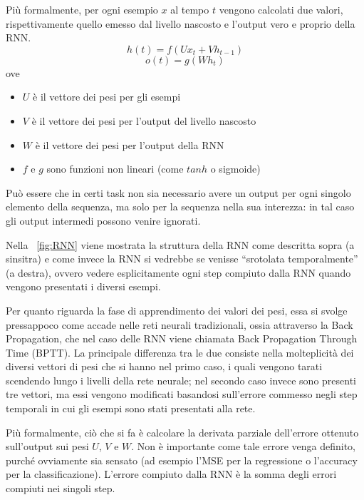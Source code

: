 Più formalmente, per ogni esempio $x$ al tempo $t$ vengono calcolati due valori, rispettivamente quello emesso dal livello nascosto e l'output vero e proprio della RNN.
\begin{equation*}
    h(t) = f(U x_t + V h_{t-1})
\end{equation*}
\begin{equation*}
    o(t) = g(W h_t)
\end{equation*}
ove
\begin{itemize}
    \item $U$ è il vettore dei pesi per gli esempi
    \item $V$ è il vettore dei pesi per l'output del livello nascosto
    \item $W$ è il vettore dei pesi per l'output della RNN
    \item $f$ e $g$ sono funzioni non lineari (come $tanh$ o sigmoide)
\end{itemize}
Può essere che in certi task non sia necessario avere un output per ogni singolo elemento della sequenza, ma solo per la sequenza nella sua interezza: in tal caso gli output intermedi possono venire ignorati.

Nella \figurename~\ref{fig:RNN} viene mostrata la struttura della RNN come descritta sopra (a sinsitra) e come invece la RNN si vedrebbe se venisse ``srotolata temporalmente'' (a destra), ovvero vedere esplicitamente ogni step compiuto dalla RNN quando vengono presentati i diversi esempi.

Per quanto riguarda la fase di apprendimento dei valori dei pesi, essa si svolge pressappoco come accade nelle reti neurali tradizionali, ossia attraverso la Back Propagation, che nel caso delle RNN viene chiamata Back Propagation Through Time (BPTT). La principale differenza tra le due consiste nella molteplicità dei diversi vettori di pesi che si hanno nel primo caso, i quali vengono tarati scendendo lungo i livelli della rete neurale; nel secondo caso invece sono presenti tre vettori, ma essi vengono modificati basandosi sull'errore commesso negli step temporali in cui gli esempi sono stati presentati alla rete.

Più formalmente, ciò che si fa è calcolare la derivata parziale dell'errore ottenuto sull'output sui pesi $U$, $V$ e $W$. Non è importante come tale errore venga definito, purché ovviamente sia sensato (ad esempio l'MSE per la regressione o l'accuracy per la classificazione). L'errore compiuto dalla RNN è la somma degli errori compiuti nei singoli step.


